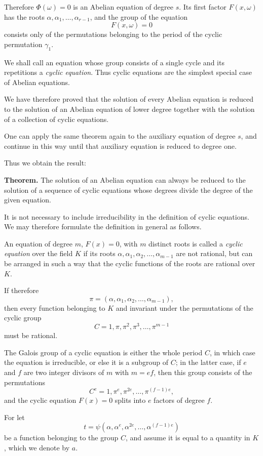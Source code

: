 \documentclass[11pt]{article}
\begin{document}
Therefore $\Phi(\omega)=0$ is an Abelian equation of degree $s$. Its first factor $F(x,\omega)$ has the roots $\alpha,\alpha_1,\dots,\alpha_{r-1}$, and the group of the equation
\[
F(x,\omega)=0
\]
consists only of the permutations belonging to the period of the cyclic permutation $\gamma_1$.

We shall call an equation whose group consists of a single cycle and its repetitions a \emph{cyclic equation}. Thus cyclic equations are the simplest special case of Abelian equations.

We have therefore proved that the solution of every Abelian equation is reduced to the solution of an Abelian equation of lower degree together with the solution of a collection of cyclic equations.

One can apply the same theorem again to the auxiliary equation of degree $s$, and continue in this way until that auxiliary equation is reduced to degree one.

Thus we obtain the result:

\medskip
\noindent\textbf{Theorem.}
The solution of an Abelian equation can always be reduced to the solution of a sequence of cyclic equations whose degrees divide the degree of the given equation.

\medskip
It is not necessary to include irreducibility in the definition of cyclic equations. We may therefore formulate the definition in general as follows.

An equation of degree $m$, $F(x)=0$, with $m$ distinct roots is called a \emph{cyclic equation} over the field $K$ if its roots $\alpha,\alpha_1,\alpha_2,\dots,\alpha_{m-1}$ are not rational, but can be arranged in such a way that the cyclic functions of the roots are rational over $K$.

If therefore
\[
\pi=(\alpha,\alpha_1,\alpha_2,\dots,\alpha_{m-1}),
\tag{6}
\]
then every function belonging to $K$ and invariant under the permutations of the cyclic group
\[
C=1,\pi,\pi^2,\pi^3,\dots,\pi^{m-1}
\tag{7}
\]
must be rational.

The Galois group of a cyclic equation is either the whole period $C$, in which case the equation is irreducible, or else it is a subgroup of $C$; in the latter case, if $e$ and $f$ are two integer divisors of $m$ with $m=ef$, then this group consists of the permutations
\[
C^e = 1,\pi^e,\pi^{2e},\dots,\pi^{(f-1)e},
\tag{8}
\]
and the cyclic equation $F(x)=0$ splits into $e$ factors of degree $f$.

For let
\[
t=\psi(\alpha,\alpha^e,\alpha^{2e},\dots,\alpha^{(f-1)e})
\]
be a function belonging to the group $C$, and assume it is equal to a quantity in $K$, which we denote by $a$.
\end{document}
